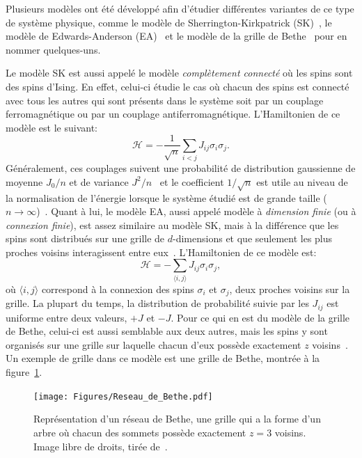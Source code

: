 Plusieurs modèles ont été développé afin d'étudier différentes variantes de ce type de système physique, comme le modèle de Sherrington-Kirkpatrick (SK)~\cite{SKspinglass}, le modèle de Edwards-Anderson (EA)~\cite{EAspinglass} et le modèle de la grille de Bethe~\cite{Bethespinglass} pour en nommer quelques-uns. %

Le modèle SK est aussi appelé le modèle \emph{complètement connecté} où les spins sont des spins d'Ising.
En effet, celui-ci étudie le cas où chacun des spins est connecté avec tous les autres qui sont présents dans le système soit par un couplage ferromagnétique ou par un couplage antiferromagnétique.
L'Hamiltonien de ce modèle est le suivant:
\begin{equation}
    \mathcal{H} = -\frac{1}{\sqrt{n}}\sum_{i < j} J_{ij}\sigma_i\sigma_j.
\end{equation}
Généralement, ces couplages suivent une probabilité de distribution gaussienne de moyenne $J_0 / n$ et de variance $J^2 / n$~\cite{rodriguez2021sherrington} et le coefficient $1/\sqrt{n}$ est utile au niveau de la normalisation de l'énergie lorsque le système étudié est de grande taille ($n \rightarrow \infty$)~\cite{stein2013spin}.
Quant à lui, le modèle EA, aussi appelé modèle à \emph{dimension finie} (ou à \emph{connexion finie}), est assez similaire au modèle SK, mais à la différence que les spins sont distribués sur une grille de $d$-dimensions et que seulement les plus proches voisins interagissent entre eux~\cite{stein2013spin}.
L'Hamiltonien de ce modèle est:
\begin{equation}
    \mathcal{H} = -\sum_{\langle i, j \rangle} J_{ij}\sigma_i\sigma_j,
\end{equation}
où $\langle i, j \rangle$ correspond à la connexion des spins $\sigma_i$ et $\sigma_j$, deux proches voisins sur la grille.
La plupart du temps, la distribution de probabilité suivie par les $J_{ij}$ est uniforme entre deux valeurs, $+J$ et $-J$\cite{stein2013spin}.
Pour ce qui en est du modèle de la grille de Bethe, celui-ci est aussi semblable aux deux autres, mais les spins y sont organisés sur une grille sur laquelle chacun d'eux possède exactement $z$ voisins~\cite{viana1985phase}.
Un exemple de grille dans ce modèle est une grille de Bethe, montrée à la figure~\ref{fig:bethe-lattice}.
\begin{figure}[h]
    \centering
    \texttt{[image: Figures/Reseau\_de\_Bethe.pdf]}
    \caption[Représentation d'un réseau de Bethe, une grille qui a la forme d'un arbre où chacun des sommets possède exactement $z = 3$ voisins.]{Représentation d'un réseau de Bethe, une grille qui a la forme d'un arbre où chacun des sommets possède exactement $z = 3$ voisins. Image libre de droits, tirée de~\protect\cite{wiki:Bethe-lattice}.}
    \label{fig:bethe-lattice}
\end{figure}

